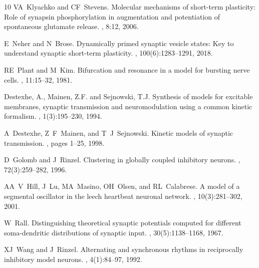 \documentclass[nofootinbib,aip,amsmath,amssymb,reprint,twocolumn,10pt]{revtex4-2}
\begin{document}
\begin{thebibliography}{10}
VA~Klyachko and CF~Stevens.
\newblock Molecular mechanisms of short-term plasticity: Role of synapsin phosphorylation in augmentation and potentiation of spontaneous glutamate release.
, 8:12, 2006.

E~Neher and N~Brose.
\newblock Dynamically primed synaptic vesicle states: Key to understand synaptic short-term plasticity.
, 100(6):1283--1291, 2018.

RE~Plant and M~Kim.
\newblock Bifurcation and resonance in a model for bursting nerve cells.
, 11:15--32, 1981.

Destexhe, A., Mainen, Z.F. and Sejnowski, T.J.
\newblock Synthesis of models for excitable membranes, synaptic transmission and neuromodulation using a common kinetic formalism.
, 1(3):195--230, 1994.

A~Destexhe, Z~F~Mainen, and T~J~Sejnowski.
\newblock Kinetic models of synaptic transmission.
, pages 1--25, 1998.

D~Golomb and J~Rinzel.
\newblock Clustering in globally coupled inhibitory neurons.
, 72(3):259--282, 1996.

AA~V~Hill, J~Lu, MA~Masino, OH~Olsen, and RL~Calabrese.
\newblock A model of a segmental oscillator in the leech heartbeat neuronal network.
, 10(3):281--302, 2001.

W~Rall.
\newblock Distinguishing theoretical synaptic potentials computed for different soma-dendritic distributions of synaptic input.
, 30(5):1138--1168, 1967.

XJ~Wang and J~Rinzel.
\newblock Alternating and synchronous rhythms in reciprocally inhibitory model neurons.
, 4(1):84--97, 1992.

\end{thebibliography}
\end{document}
